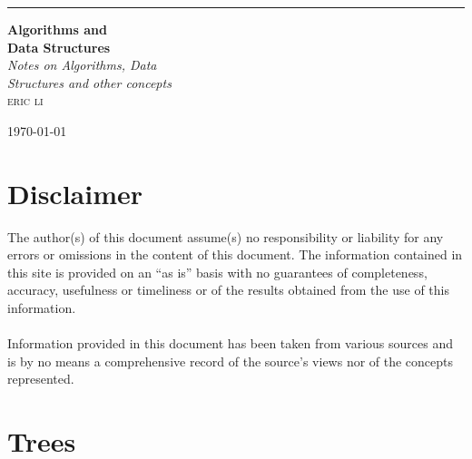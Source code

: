 \documentclass[hidelinks,11pt]{article}
\begin{document}
\begin{titlepage} %

	\raggedleft %
	\rule{1pt}{\textheight} %
	\hspace{0.05\textwidth} %
	\parbox[b]{0.75\textwidth}{ %
        {\Huge\bfseries Algorithms and\\[0.5\baselineskip]Data Structures }\\[2\baselineskip] %
        
        {\large\textit{Notes on Algorithms, Data \\[0.5\baselineskip]Structures and other concepts}}\\[4\baselineskip] %
        
        {\Large\textsc{eric li}} %
        
        \vspace{0.5\textheight} %
        
        {\noindent\large\today}\\[\baselineskip]
    }
\end{titlepage}
\tableofcontents
\newpage
\section{Disclaimer}
The author(s) of this document assume(s) no responsibility or liability for any errors or omissions in the content of this document. The information contained in this site is provided on an “as is” basis with no guarantees of completeness, accuracy, usefulness or timeliness or of the results obtained from the use of this information.\\\\
Information provided in this document has been taken from various sources and is by no means a comprehensive record of the source's views nor of the concepts represented.
\section{Trees}
\end{document}
